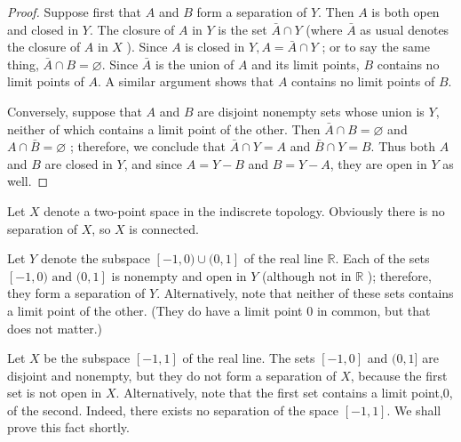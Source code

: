 \begin{proof}
Suppose first that \(A\) and \(B\) form a separation of \(Y\). Then \(A\) is both open and closed in \(Y\). The closure of \(A\) in \(Y\) is the set \(\bar{A} \cap Y\) (where \(\bar{A}\) as usual denotes the closure of \(A\) in \(X\) ). Since \(A\) is closed in \(Y,A = \bar{A} \cap Y\) ; or to say the same thing, \(\bar{A} \cap B = \varnothing\). Since \(\bar{A}\) is the union of \(A\) and its limit points, \(B\) contains no limit points of \(A\). A similar argument shows that \(A\) contains no limit points of \(B\).

Conversely, suppose that \(A\) and \(B\) are disjoint nonempty sets whose union is \(Y\), neither of which contains a limit point of the other. Then \(\bar{A} \cap B = \varnothing\) and \(A \cap \bar{B} = \varnothing\) ; therefore, we conclude that \(\bar{A} \cap Y = A\) and \(\bar{B} \cap Y = B\). Thus both \(A\) and \(B\) are closed in \(Y\), and since \(A = Y - B\) and \(B = Y - A\), they are open in \(Y\) as well.
\end{proof}

\begin{centeredblock}
\begin{example}
\label{ex:\thesection.\theexample}
 Let \(X\) denote a two-point space in the indiscrete topology. Obviously there is no separation of \(X\), so \(X\) is connected.
\end{example}
\end{centeredblock}

\begin{centeredblock}
\begin{example}
\label{ex:\thesection.\theexample}
 Let \(Y\) denote the subspace \([ {-1,0)\cup (0,1}]\) of the real line \(\mathbb{R}\). Each of the sets \([ {-1,0)\text{ and }(0,1}]\) is nonempty and open in \(Y\) (although not in \(\mathbb{R}\) ); therefore, they form a separation of \(Y\). Alternatively, note that neither of these sets contains a limit point of the other. (They do have a limit point 0 in common, but that does not matter.)
\end{example}
\end{centeredblock}

\begin{centeredblock}
\begin{example}
\label{ex:\thesection.\theexample}
 Let \(X\) be the subspace \([ {-1,1}]\) of the real line. The sets \([ {-1,0}]\) and \((0,1\rbrack\) are disjoint and nonempty, but they do not form a separation of \(X\), because the first set is not open in \(X\). Alternatively, note that the first set contains a limit point,0, of the second. Indeed, there exists no separation of the space \([ {-1,1}]\). We shall prove this fact shortly.
\end{example}
\end{centeredblock}


